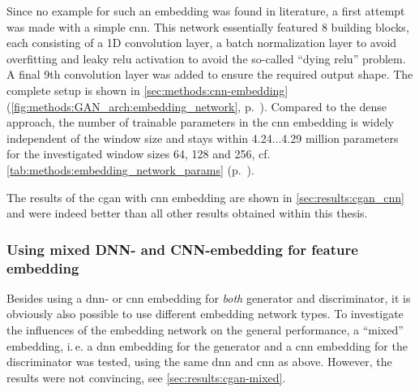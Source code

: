Since no example for such an embedding was found in literature, a first attempt was made with a simple \acrfull{cnn}.
This network essentially featured 8 building blocks, each consisting of a 1D convolution layer, a batch normalization layer to avoid overfitting
and leaky \acrshort{relu} activation \cite{Maas2013} to avoid the so-called ``dying \acrshort{relu}'' problem. 
A final 9th convolution layer was added to ensure the required output shape. 
The complete setup is shown in \cref{sec:methods:cnn-embedding} (\cref{fig:methods:GAN_arch:embedding_network}, p.~\pageref{fig:methods:GAN_arch:embedding_network}).
Compared to the dense approach, the number of trainable parameters in the \acrshort{cnn} embedding is widely independent of the window size and 
stays within 4.24...4.29 million parameters for the investigated window sizes 64, 128 and 256, cf. \cref{tab:methods:embedding_network_params} (p.~\pageref{tab:methods:embedding_network_params}).

The results of the \acrshort{cgan} with \acrshort{cnn} embedding are shown in \cref{sec:results:cgan_cnn} 
and were indeed better than all other results obtained within this thesis.

\subsubsection{Using mixed DNN- and CNN-embedding for feature embedding} \label{sec:improve:mixed-embedding}
Besides using a \acrshort{dnn}- or \acrshort{cnn} embedding for \emph{both} generator and discriminator, it is obviously also possible
to use different embedding network types.
To investigate the influences of the embedding network on the general performance,
a ``mixed'' embedding, i.\,e. a \acrshort{dnn} embedding for the generator and a \acrshort{cnn} embedding for the discriminator was tested,
using the same \acrshort{dnn} and \acrshort{cnn} as above.
However, the results were not convincing, see \cref{sec:results:cgan-mixed}.










